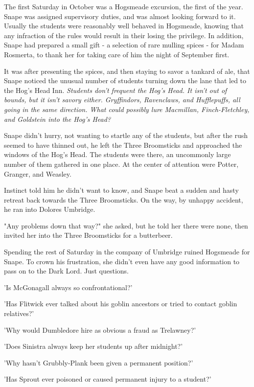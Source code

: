 \documentclass[a4paper,11pt]{article}
\begin{document}
The first Saturday in October was a Hogsmeade excursion, the first of the year. Snape was assigned supervisory duties, and was almost looking forward to it. Usually the students were reasonably well behaved in Hogsmeade, knowing that any infraction of the rules would result in their losing the privilege. In addition, Snape had prepared a small gift - a selection of rare mulling spices - for Madam Rosmerta, to thank her for taking care of him the night of September first.

It was after presenting the spices, and then staying to savor a tankard of ale, that Snape noticed the unusual number of students turning down the lane that led to the Hog's Head Inn. \emph{Students don't frequent the Hog's Head. It isn't out of bounds, but it isn't savory either. Gryffindors, Ravenclaws, and Hufflepuffs, all going in the same direction. What could possibly lure Macmillan, Finch-Fletchley, and Goldstein into the Hog's Head?}

Snape didn't hurry, not wanting to startle any of the students, but after the rush seemed to have thinned out, he left the Three Broomsticks and approached the windows of the Hog's Head. The students were there, an uncommonly large number of them gathered in one place. At the center of attention were Potter, Granger, and Weasley.

Instinct told him he didn't want to know, and Snape beat a sudden and hasty retreat back towards the Three Broomsticks. On the way, by unhappy accident, he ran into Dolores Umbridge.

"Any problems down that way?" she asked, but he told her there were none, then invited her into the Three Broomsticks for a butterbeer.

Spending the rest of Saturday in the company of Umbridge ruined Hogsmeade for Snape. To crown his frustration, she didn't even have any good information to pass on to the Dark Lord. Just questions.

'Is McGonagall always so confrontational?'

'Has Flitwick ever talked about his goblin ancestors or tried to contact goblin relatives?'

'Why would Dumbledore hire as obvious a fraud as Trelawney?'

'Does Sinistra always keep her students up after midnight?'

'Why hasn't Grubbly-Plank been given a permanent position?'

'Has Sprout ever poisoned or caused permanent injury to a student?'
\end{document}
